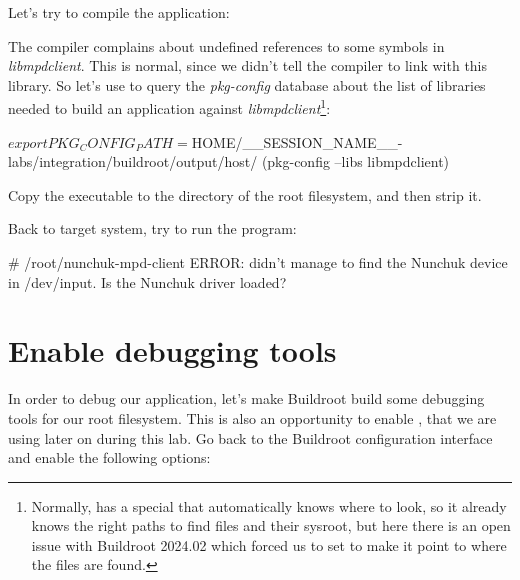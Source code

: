 Let's try to compile the application:
\begin{bashinput}
$ %
\end{bashinput}
The compiler complains about undefined references to some symbols in
{\em libmpdclient}. This is normal, since we didn't tell the compiler
to link with this library. So let's use  to query the
{\em pkg-config} database about the list of libraries needed to build
an application against {\em libmpdclient}\footnote{Normally,
 has a special  that
automatically knows where to look, so it already knows the right paths
to find  files and their sysroot, but here there is an open
issue with Buildroot 2024.02 which forced us to set
 to make it point to where the 
files are found.}:

\begin{bashinput}
$ export PKG_CONFIG_PATH=$HOME/__SESSION_NAME__-labs/integration/buildroot/output/host/%
$ %
$(pkg-config --libs libmpdclient)
\end{bashinput}

Copy the  executable to the  directory
of the root filesystem, and then strip it.

Back to target system, try to run the program:

\begin{bashinput}
# /root/nunchuk-mpd-client
ERROR: didn't manage to find the Nunchuk device in /dev/input. Is the Nunchuk driver loaded?
\end{bashinput}

\section{Enable debugging tools}

In order to debug our application, let's make Buildroot build some
debugging tools for our root filesystem. This is also an opportunity to
enable , that we are using later on during this lab. Go back to
the Buildroot configuration interface and enable the following options:

